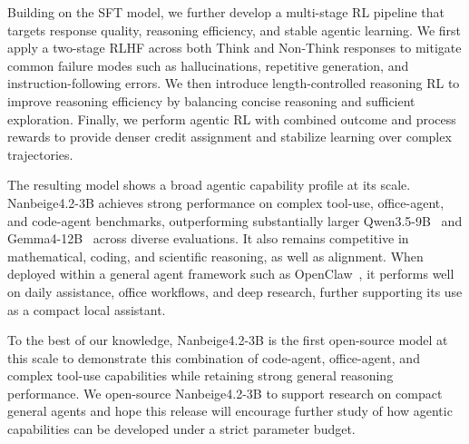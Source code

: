Building on the SFT model, we further develop a multi-stage RL pipeline that targets response quality, reasoning efficiency, and stable agentic learning. 
We first apply a two-stage RLHF across both Think and Non-Think responses to mitigate common failure modes such as hallucinations, repetitive generation, and instruction-following errors.
We then introduce length-controlled reasoning RL to improve reasoning efficiency by balancing concise reasoning and sufficient exploration. 
Finally, we perform agentic RL with combined outcome and process rewards to provide denser credit assignment and stabilize learning over complex trajectories.

The resulting model shows a broad agentic capability profile at its scale. Nanbeige4.2-3B achieves strong performance on complex tool-use, office-agent, and code-agent benchmarks, outperforming substantially larger Qwen3.5-9B~\cite{qwen3.5} and Gemma4-12B~\cite{team2026gemma} across diverse evaluations. It also remains competitive in mathematical, coding, and scientific reasoning, as well as alignment. When deployed within a general agent framework such as OpenClaw~\cite{openclaw}, it performs well on daily assistance, office workflows, and deep research, further supporting its use as a compact local assistant.

To the best of our knowledge, Nanbeige4.2-3B is the first open-source model at this scale to demonstrate this combination of code-agent, office-agent, and complex tool-use capabilities while retaining strong general reasoning performance. We open-source Nanbeige4.2-3B to support research on compact general agents and hope this release will encourage further study of how agentic capabilities can be developed under a strict parameter budget.
